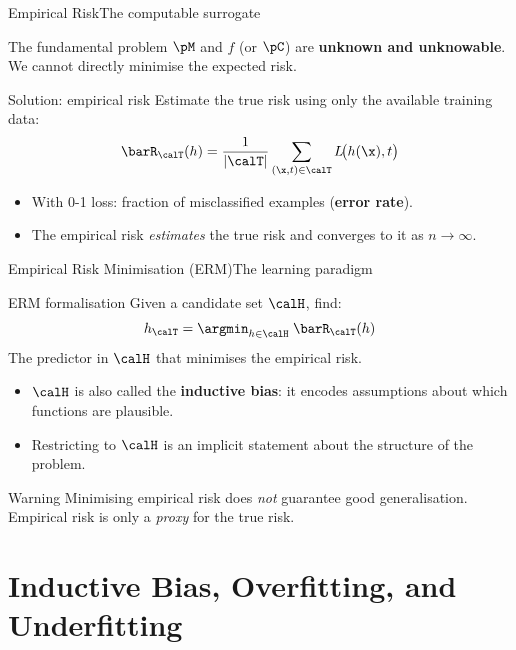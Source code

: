 \begin{frame}{Empirical Risk}{The computable surrogate}
  \begin{alertblock}{The fundamental problem}
    $\pM$ and $f$ (or $\pC$) are \textbf{unknown and unknowable}. We cannot directly
    minimise the expected risk.
  \end{alertblock}
  \bigskip
  \begin{block}{Solution: empirical risk}
    Estimate the true risk using only the available training data:
    \[
      \barR_\calT(h)
        = \frac{1}{|\calT|} \sum_{(\x,t)\in\calT} L\!\bigl(h(\x), t\bigr)
    \]
  \end{block}
  \begin{itemize}
    \item With 0-1 loss: fraction of misclassified examples
          (\textcolor{AccentBlue}{\textbf{error rate}}).
    \item The empirical risk \emph{estimates} the true risk and converges to it as
          $n \to \infty$.
  \end{itemize}
\end{frame}

\begin{frame}{Empirical Risk Minimisation (ERM)}{The learning paradigm}
  \begin{block}{ERM formalisation}
    Given a candidate set $\calH$, find:
    \[
      h_\calT = \argmin_{h \in \calH}\; \barR_\calT(h)
    \]
    The predictor in $\calH$ that minimises the empirical risk.
  \end{block}
  \begin{itemize}
    \item $\calH$ is also called the \textcolor{AccentBlue}{\textbf{inductive bias}}: it
          encodes assumptions about which functions are plausible.
    \item Restricting to $\calH$ is an implicit statement about the structure of the problem.
  \end{itemize}
  \bigskip
  \begin{alertblock}{Warning}
    Minimising empirical risk does \emph{not} guarantee good generalisation.
    Empirical risk is only a \emph{proxy} for the true risk.
  \end{alertblock}
\end{frame}

\section{Inductive Bias, Overfitting, and Underfitting}

